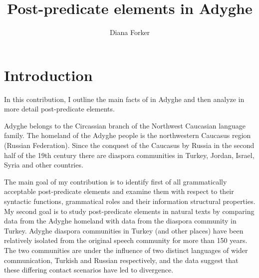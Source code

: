 \documentclass[output=paper,colorlinks,citecolor=brown, draft]{langscibook}
\author{Diana Forker\orcid{0000-0003-4247-9163}\affiliation{Friedrich Schiller University Jena}}
\title{Post-predicate elements in Adyghe}
\begin{document}
\maketitle\label{WOWA:ch:11}

\section{Introduction}\label{Adyghe:ss:1}

In this contribution, I outline the main facts of  in Adyghe and then analyze in more detail post-predicate elements.

Adyghe belongs to the Circassian branch of the Northwest Caucasian language family. The homeland of the Adyghe people is the northwestern Caucasus region (Russian Federation). Since the conquest of the Caucasus by Russia in the second half of the 19th century there are diaspora communities in Turkey, Jordan, Israel, Syria and other countries. 

\largerpage

The main goal of my contribution is to identify first of all grammatically acceptable post-predicate elements and examine them with respect to their syntactic functions, grammatical roles and their information structural properties. My second goal is to study post-predicate elements in natural texts by comparing data from the Adyghe homeland with data from the diaspora community in Turkey. Adyghe diaspora communities in Turkey (and other places) have been relatively isolated from the original speech community for more than 150 years. The two communities are under the influence of two distinct languages of wider communication, Turkish and Russian respectively, and the data suggest that these differing contact scenarios have led to divergence.
\end{document}

